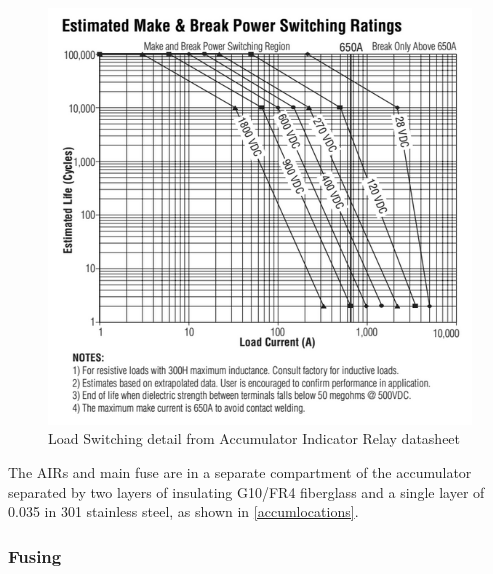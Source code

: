 \documentclass{article}
\begin{document}
            \begin{figure}[H]
                \centering
                \includegraphics[width = 0.7 \textwidth]{AIRswitching}
                \caption{Load Switching detail from Accumulator Indicator Relay datasheet}
                \label{airswitch}
            \end{figure}

            The AIRs and main fuse are in a separate compartment of the accumulator separated by two layers of insulating G10/FR4 fiberglass and a single layer of 0.035 in 301 stainless steel, as shown in \ref{accumlocations}.

        \subsubsection{Fusing} \label{fusing}

\end{document}
